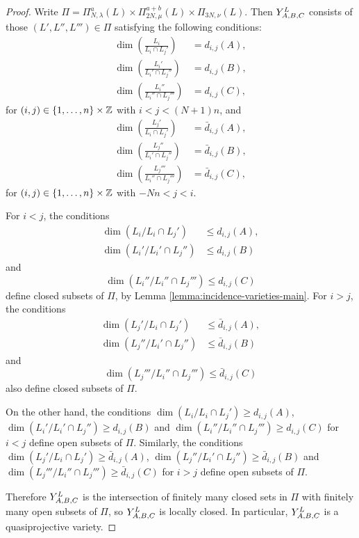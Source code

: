 \documentclass[a4paper, 11pt]{report}
\begin{document}
\begin{proof}
Write $\Pi=\Pi_{N,\lambda}^a(L)\times\Pi_{2N,\mu}^{a+b}(L)\times\Pi_{3N,\nu}(L)$. Then $\yprod[L]{A,B,C}$ consists of those $(L',L'',L''')\in\Pi$ satisfying the following conditions:
\begin{align}
\dim\left(\frac{L_i}{L_i\cap L_j'}\right) &= d_{i,j}{(A)},\\
\dim\left(\frac{L_i'}{L_i'\cap L_j''}\right) &= d_{i,j}{(B)},\\
\dim\left(\frac{L_i''}{L_i''\cap L_j'''}\right) &= d_{i,j}{(C)},
\end{align}
for $(i,j)\in \{1,\ldots,n\}\times\integers$ with $i<j<(N+1)n$, and
\begin{align}
\dim\left(\frac{L_j'}{L_i\cap L_j'}\right) &= \bar{d}_{i,j}{(A)},\\
\dim\left(\frac{L_j''}{L_i'\cap L_j''}\right) &= \bar{d}_{i,j}{(B)},\\
\dim\left(\frac{L_j'''}{L_i''\cap L_j'''}\right) &= \bar{d}_{i,j}{(C)},
\end{align}
for $(i,j)\in \{1,\ldots,n\}\times\integers$ with $-Nn<j<i$.

For $i<j$, the conditions
\begin{align*}
\dim\left(L_i/{L_i\cap L_j'}\right)&\le d_{i,j}{(A)},\\
\dim\left(L_i'/{L_i'\cap L_j''}\right)&\le d_{i,j}{(B)}
\end{align*}
and
\begin{equation*} 
\dim\left(L_i''/{L_i''\cap L_j'''}\right)\le d_{i,j}{(C)}
\end{equation*}
define closed subsets of $\Pi$, by Lemma \ref{lemma:incidence-varieties-main}. For $i>j$, the conditions
\begin{align*}
\dim\left(L_j'/{L_i\cap L_j'}\right)&\le \bar{d}_{i,j}{(A)},\\
\dim\left(L_j''/{L_i'\cap L_j''}\right)&\le \bar{d}_{i,j}{(B)}
\end{align*}
and
\begin{equation*}
\dim\left(L_j'''/{L_i''\cap L_j'''}\right)\le \bar{d}_{i,j}{(C)}
\end{equation*}
also define closed subsets of $\Pi$.

On the other hand, the conditions $\dim\left(L_i/{L_i\cap L_j'}\right)\geq d_{i,j}{(A)}$, $\dim\left(L_i'/{L_i'\cap L_j''}\right)\geq d_{i,j}{(B)}$ and $\dim\left(L_i''/{L_i''\cap L_j'''}\right)\geq d_{i,j}{(C)}$ for $i<j$ define open subsets of $\Pi$. Similarly, the conditions $\dim\left(L_j'/{L_i\cap L_j'}\right)\geq \bar{d}_{i,j}{(A)}$, $\dim\left(L_j''/{L_i'\cap L_j''}\right)\geq \bar{d}_{i,j}{(B)}$ and $\dim\left(L_j'''/{L_i''\cap L_j'''}\right)\geq \bar{d}_{i,j}{(C)}$ for $i>j$ define open subsets of $\Pi$.

Therefore $\yprod[L]{A,B,C}$ is the intersection of finitely many closed sets in $\Pi$ with finitely many open subsets of $\Pi$, so $\yprod[L]{A,B,C}$ is locally closed. In particular, $\yprod[L]{A,B,C}$ is a quasiprojective variety.
\end{proof}
\end{document}
